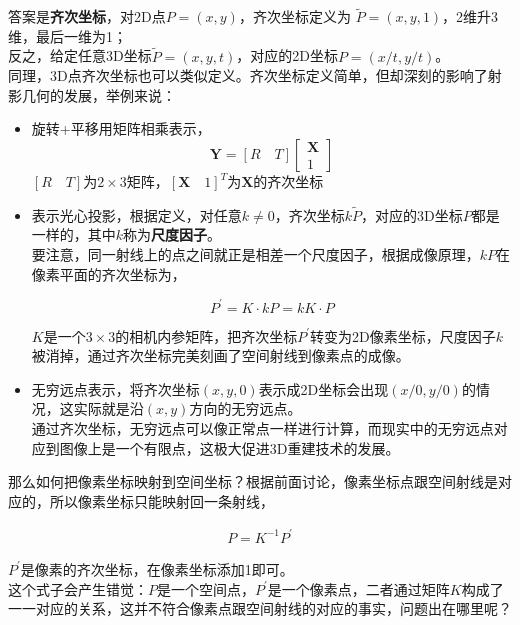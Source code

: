 \documentclass[hpyerref,UTF8,a4paper,titlepage,12pt,oneside]{ctexbook}
\theoremstyle{definition}
\begin{document}
		答案是\textbf{齐次坐标}，对2D点$P = (x,y)$，齐次坐标定义为 $\tilde{P} = (x,y,1)$，2维升3维，最后一维为1；\\

		反之，给定任意3D坐标$\tilde{P} = (x,y,t)$，对应的2D坐标$P = (x/t,y/t)$。\\

		同理，3D点齐次坐标也可以类似定义。齐次坐标定义简单，但却深刻的影响了射影几何的发展，举例来说：
		\begin{itemize}
			\item 旋转+平移用矩阵相乘表示，
				$$
					\mathbf{Y} = [R\quad T]
					\begin{bmatrix}
						\mathbf{X}\\
						1
					\end{bmatrix}
				$$
				$[R\quad T]$为$2 \times 3$矩阵，$[\mathbf{X}\quad 1]^T$为$\mathbf{X}$的齐次坐标
			\item 表示光心投影，根据定义，对任意$k\neq 0$，齐次坐标$k\tilde{P}$，对应的3D坐标$P$都是一样的，其中$k$称为\textbf{尺度因子}。\\

				要注意，同一射线上的点之间就正是相差一个尺度因子，根据成像原理，$kP$在像素平面的齐次坐标为，

				$$
					P^{\prime} = K \cdot k P = k K\cdot P
				$$

				$K$是一个$3\times 3$的相机内参矩阵，把齐次坐标$P^{\prime}$转变为2D像素坐标，尺度因子$k$被消掉，通过齐次坐标完美刻画了空间射线到像素点的成像。
			
			\item 无穷远点表示，将齐次坐标$(x,y,0)$表示成2D坐标会出现$(x/0,y/0)$的情况，这实际就是沿$(x,y)$方向的无穷远点。\\

				通过齐次坐标，无穷远点可以像正常点一样进行计算，而现实中的无穷远点对应到图像上是一个有限点，这极大促进3D重建技术的发展。
		\end{itemize}		

	那么如何把像素坐标映射到空间坐标？根据前面讨论，像素坐标点跟空间射线是对应的，所以像素坐标只能映射回一条射线，

	\begin{align}
		P = K^{-1}P^{\prime} \label{one_one_error}
	\end{align}

	$P^{\prime}$是像素的齐次坐标，在像素坐标添加1即可。\\

	这个式子会产生错觉：$P$是一个空间点，$P^{\prime}$是一个像素点，二者通过矩阵$K$构成了一一对应的关系，这并不符合像素点跟空间射线的对应的事实，问题出在哪里呢？\\
\end{document}
